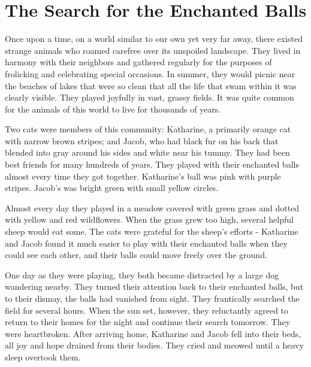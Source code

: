 \chapter{The Search for the Enchanted Balls}
\setlength{\parindent}{2em}
\LARGE
{}\baselineskip

Once upon a time, on a world similar to our own yet very far away, there existed strange animals who roamed carefree over its unspoiled landscape. They lived in harmony with their neighbors and gathered regularly for the purposes of frolicking and celebrating special occasions. In summer, they would picnic near the beaches of lakes that were so clean that all the life that swam within it was clearly visible. They played joyfully in vast, grassy fields. It was quite common for the animals of this world to live for thousands of years.

Two cats were members of this community: Katharine, a primarily orange cat with narrow brown stripes; and Jacob, who had black fur on his back that blended into gray around his sides and white near his tummy. They had been best friends for many hundreds of years. They played with their enchanted balls almost every time they got together. Katharine's ball was pink with purple stripes. Jacob's was bright green with small yellow circles.

Almost every day they played in a meadow covered with green grass and dotted with yellow and red wildflowers. When the grass grew too high, several helpful sheep would eat some. The cats were grateful for the sheep’s efforts - Katharine and Jacob found it much easier to play with their enchanted balls when they could see each other, and their balls could move freely over the ground.

One day as they were playing, they both became distracted by a large dog wandering nearby. They turned their attention back to their enchanted balls, but to their dismay, the balls had vanished from sight. They frantically searched the field for several hours. When the sun set, however, they reluctantly agreed to return to their homes for the night and continue their search tomorrow. They were heartbroken. After arriving home, Katharine and Jacob fell into their beds, all joy and hope drained from their bodies. They cried and meowed until a heavy sleep overtook them.

